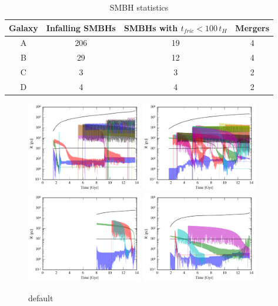 \documentclass[english, apj]{emulateapj}
\begin{document}
\begin{table}
\centering
\caption{SMBH statistics}
\begin{tabular}{c| c |c |c}
Galaxy & Infalling SMBHs & SMBHs with $t_{fric}<100\,t_H$ & Mergers \\
\hline
A & 206 & 19 & 4 \\
B & 29 & 12 & 4 \\
C & 3 & 3 & 2 \\
D & 4 & 4 & 2 \\
\end{tabular}
\end{table}

\begin{figure}[htbp]
\begin{center}
\includegraphics[width=0.45\textwidth]{plots/radius_A.png}
\includegraphics[width=0.45\textwidth]{plots/radius_B.png}\\
\includegraphics[width=0.45\textwidth]{plots/radius_C.png}
\includegraphics[width=0.45\textwidth]{plots/radius_D.png}\\
\caption{default}
\label{default2}
\end{center}
\end{figure}
\end{document}
